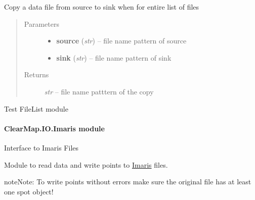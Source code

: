 \documentclass[letterpaper,10pt,english]{sphinxmanual}
\begin{document}

\begin{fulllineitems}
\label{api/ClearMap.IO:ClearMap.IO.FileList.copyData}
Copy a data file from source to sink when for entire list of files
\begin{quote}\begin{description}
\item[{Parameters}] \leavevmode\begin{itemize}
\item {} 
\textbf{source} (\emph{str}) --
file name pattern of source

\item {} 
\textbf{sink} (\emph{str}) --
file name pattern of sink

\end{itemize}

\item[{Returns}] \leavevmode
\emph{str} --
file name patttern of the copy

\end{description}\end{quote}

\end{fulllineitems}


\begin{fulllineitems}
\label{api/ClearMap.IO:ClearMap.IO.FileList.test}
Test FileList module

\end{fulllineitems}



\paragraph{ClearMap.IO.Imaris module}
\label{api/ClearMap.IO:clearmap-io-imaris-module}\label{api/ClearMap.IO:module-ClearMap.IO.Imaris}
Interface to Imaris Files

Module to read data and write points to \href{http://www.bitplane.com/imaris/imaris}{Imaris}
files.

\begin{notice}{note}{Note:}
To write points without errors make sure the original file has at least one spot object!
\end{notice}
\end{document}
